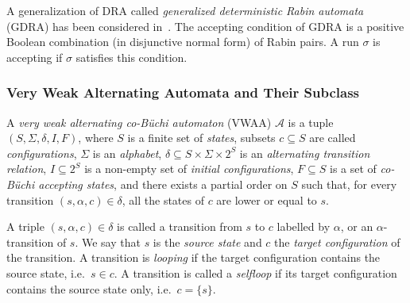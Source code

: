 \documentclass{llncs}
\newcommand{\mA}{\mathcal{A}}
\begin{document}
A generalization of DRA called \emph{generalized deterministic Rabin
  automata} (GDRA) has been considered in~\cite{KE12,GKE12}. The accepting
condition of GDRA is a positive Boolean combination (in disjunctive normal
form) of Rabin pairs. A run $\sigma$ is accepting if $\sigma$ satisfies this
condition.








\subsubsection{Very Weak Alternating Automata and Their Subclass}
\label{def:MMAA}

A \emph{very weak alternating co-B\"{u}chi automaton} (VWAA) $\mA$
is a tuple $(S,\Sigma,\delta,I,F)$, where $S$ is a finite set of
\emph{states}, subsets $c\subseteq S$ are called \emph{configurations},
$\Sigma$ is an \emph{alphabet}, $\delta \subseteq S \times \Sigma \times
2^S$ is an \emph{alternating transition relation}, $I \subseteq 2^S$ is a
non-empty set of \emph{initial configurations}, $F\subseteq S$ is a set of
\emph{co-B\"{u}chi accepting states}, and there exists a partial order on
$S$ such that, for every transition $(s,\alpha,c)\in\delta$, all the states
of $c$ are lower or equal to $s$.

A triple $(s,\alpha,c)\in\delta$ is called a transition from $s$ to $c$
labelled by $\alpha$, or an $\alpha$-transition of $s$.  We say that $s$ is
the \emph{source state} and $c$ the \emph{target configuration} of the
transition.  A transition is \emph{looping} if the target configuration
contains the source state, i.e.~$s\in c$.  A transition is called a
\emph{selfloop} if its target configuration contains the source state only,
i.e.~$c=\{s\}$.
\end{document}
